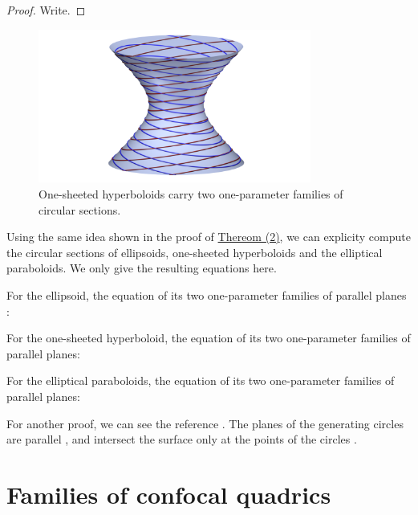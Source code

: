 \documentclass[10pt, a4paper]{article}
\theoremstyle{BoldTopSpacing}
\theoremstyle{BoldTopSpacing}
\theoremstyle{BoldTopSpacing}
\theoremstyle{BoldTopBottomSpacing}
\theoremstyle{BoldTopSpacing}
\theoremstyle{BoldTopBottomSpacing}
\theoremstyle{remark}
\begin{document}
\begin{proof}
    Write.
\end{proof}


\begin{figure}[H]
    \centering
    \includegraphics[width=0.8\textwidth]{circles_sections_of_one_sheeted_hyperboloid.png}
    \caption{One-sheeted hyperboloids carry two one-parameter families of circular sections.}
    \label{fig:circular_sections_one_sheeted}
\end{figure}

Using the same idea shown in the proof of \hyperref[thm:circular-sections-hyperboloid]{Thereom (2)}, we can explicity compute the circular sections of ellipsoids, one-sheeted hyperboloids and the elliptical paraboloids. We only give the resulting equations here. \par
For the ellipsoid, the equation of its two one-parameter families of parallel planes \cite{geometryIII}: \par
For the one-sheeted hyperboloid, the equation of its two one-parameter families of parallel planes: \par
For the elliptical paraboloids, the equation of its two one-parameter families of parallel planes: \par

For another proof, we can see the reference \cite{nilovSurfaceContainingLine2011}. The planes of the generating circles are parallel \cite[\textcolor{CitationColor}{\textit{Lemma~2.1}}]{nilovSurfaceContainingLine2011}, and intersect the surface only at the points of the circles \cite[\textcolor{CitationColor}{\textit{Lemma~2.6}}]{nilovSurfaceContainingLine2011}.

\pagebreak
\section{Families of confocal quadrics}
\label{sec:confocal-quadrics}
\end{document}
